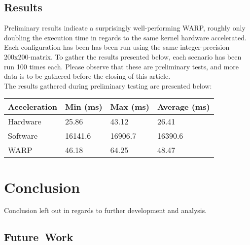 \documentclass[fleqn,10pt]{SelfArx} %
\begin{document}
\subsection{Results}
\label{sec:contribution:results}
Preliminary results indicate a surprisingly well-performing WARP, roughly only doubling the execution time in regards to the same kernel hardware accelerated. Each configuration has been has been run using the same integer-precision 200x200-matrix. To gather the results presented below, each scenario has been run 100 times each. Please observe that these are preliminary tests, and more data is to be gathered before the closing of this article. \\
The results gathered during preliminary testing are presented below:
\begin{center}
	\begin{tabular}{| l | l | l | l |}
	\hline
	Acceleration & Min (ms) & Max (ms) & Average (ms)	\\ \hline
	Hardware & 25.86  & 43.12  & 26.41			\\ \hline
	Software & 16141.6 & 16906.7 & 16390.6		\\ \hline
	WARP & 46.18 & 64.25 & 48.47				\\
	\hline
	\end{tabular}
\end{center}


\section{Conclusion}
\label{sec:conclusion}
Conclusion left out in regards to further development and analysis.

\subsection{Future~Work}
\label{sec:conclusion:futurework}

\end{document}
